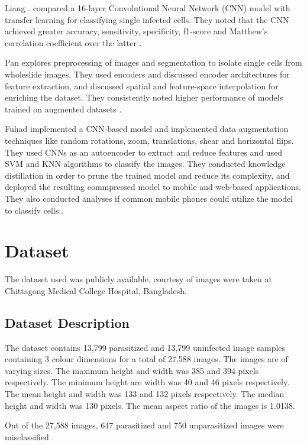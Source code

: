 \documentclass[10pt,twocolumn,letterpaper]{article}
\begin{document}
Liang \etal. compared a 16-layer Convolutional Neural Network (CNN) model with transfer learning for classifying single infected cells. They noted that the CNN achieved greater accuracy, sensitivity, specificity, f1-score and Matthew's correlation coefficient over the latter \cite{7822567}.

Pan \etal explores preprocessing of images and segmentation to isolate single cells from wholeslide images. They used encoders and discussed encoder architectures for feature extraction, and discussed spatial and feature-space interpolation for enriching the dataset. They consistently noted higher performance of models trained on augmented datasets \cite{Pan18}.

Fuhad \etal implemented a CNN-based model and implemented data augmentation techniques like random rotations, zoom, translations, shear and horizontal flips. They used CNNs as an autoencoder to extract and reduce features and used SVM and KNN algorithms to classify the images. They conducted knowledge distillation in order to prune the trained model and reduce its complexity, and deployed the resulting commpressed model to mobile and web-based applications. They also conducted analyses if common mobile phones could utilize the model to classify cells.\cite{fuhadmalaria}.

\section{Dataset}
The dataset used was publicly available, courtesy of  images were taken at Chittagong Medical College Hospital, Bangladesh.\cite{datasetref}

\subsection{Dataset Description}
The dataset contains 13,799 parasitized and 13,799 uninfected image samples containing 3 colour dimensions for a total of 27,588 images. The images are of varying sizes. The maximum height and width was 385 and 394 pixels respectively. The minimum height are width was 40 and 46 pixels respectively. The mean height and width was 133 and 132 pixels respectively. The median height and width was 130 pixels. The mean aspect ratio of the images is 1.0138.

Out of the 27,588 images, 647 parasitized and 750 unparasitized images were misclassified \cite{fuhadmalaria}.
\end{document}
